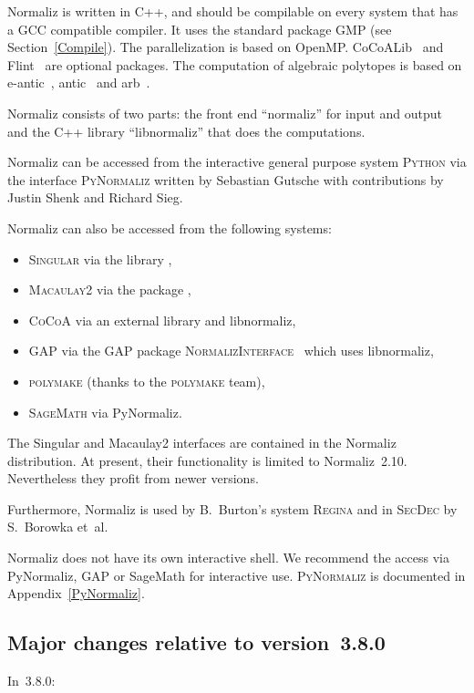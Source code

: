 Normaliz is written in C++, and should be compilable on every system that has a GCC compatible compiler. It uses the standard package GMP (see Section~\ref{Compile}). The parallelization is based on OpenMP. CoCoALib~\cite{CoCoA} and Flint~\cite{Flint} are optional packages. The computation of algebraic polytopes is based on e-antic~\cite{e-antic}, antic~\cite{antic} and arb~\cite{arb}.

Normaliz consists of two parts: the front end ``normaliz'' for input and output and the C++ library ``libnormaliz'' that does the computations.

Normaliz can be accessed from the interactive general purpose system \textsc{Python} via the interface \textsc{PyNormaliz} written by Sebastian Gutsche with contributions by Justin Shenk and Richard Sieg.

Normaliz can also be accessed from the following systems:
\begin{itemize}
	\item \textsc{Singular} via the library ,
	\item \textsc{Macaulay2} via the package ,
	\item \textsc{CoCoA} via an external library and libnormaliz,
	\item \textsc{GAP} via the GAP package \textsc{NormalizInterface}~\cite{GAP-NmzInterface} which uses libnormaliz,
	\item \textsc{polymake} (thanks to the \textsc{polymake}
	team),
	\item \textsc{SageMath} via PyNormaliz.
\end{itemize}

The Singular and Macaulay2 interfaces are contained in the
Normaliz distribution. At present, their functionality is limited to Normaliz~2.10. Nevertheless they profit from newer versions.

Furthermore, Normaliz is used by B.~Burton's system
\textsc{Regina} and in \textsc{SecDec} by S.~Borowka et~al.

Normaliz does not have its own interactive shell. We recommend the access via PyNormaliz, GAP or SageMath for interactive use. \textsc{PyNormaliz} is documented in Appendix~\ref{PyNormaliz}.


\subsection{Major changes relative to version~3.8.0}

In~3.8.0:

